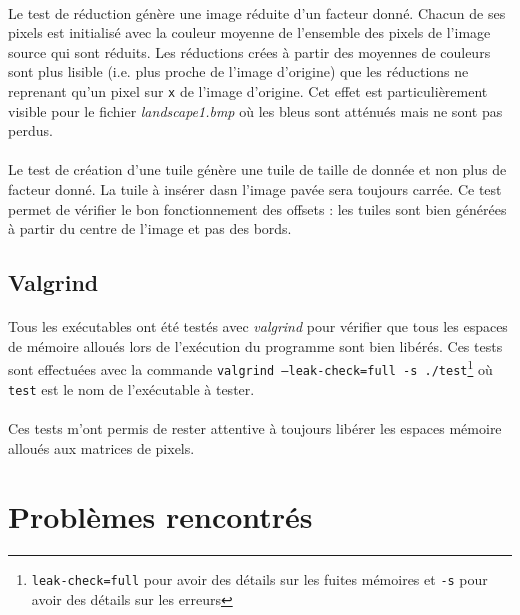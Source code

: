 \documentclass{article}
\begin{document}
    \paragraph{}
    Le test de réduction génère une image réduite d'un facteur donné. Chacun de ses pixels est initialisé avec la couleur moyenne de l'ensemble des pixels de l'image source qui sont réduits. Les réductions crées à partir des moyennes de couleurs sont plus lisible (i.e. plus proche de l'image d'origine) que les réductions ne reprenant qu'un pixel sur \texttt{x} de l'image d'origine. Cet effet est particulièrement visible pour le fichier \emph{landscape1.bmp} où les bleus sont atténués mais ne sont pas perdus.

    \paragraph{}
    Le test de création d'une tuile génère une tuile de taille de donnée et non plus de facteur donné. La tuile à insérer dasn l'image pavée sera toujours carrée. Ce test permet de vérifier le bon fonctionnement des offsets : les tuiles sont bien générées à partir du centre de l'image et pas des bords.



    \subsection{Valgrind}
    \paragraph{}
    Tous les exécutables ont été testés avec \emph{valgrind} pour vérifier que tous les espaces de mémoire alloués lors de l'exécution du programme sont bien libérés. Ces tests sont effectuées avec la commande \texttt{valgrind --leak-check=full -s ./test}\footnote{\texttt{leak-check=full} pour avoir des détails sur les fuites mémoires et \texttt{-s} pour avoir des détails sur les erreurs} où \texttt{test} est le nom de l'exécutable à tester.

    \paragraph{}
    Ces tests m'ont permis de rester attentive à toujours libérer les espaces mémoire alloués aux matrices de pixels.



    \newpage
    \section{Problèmes rencontrés}

    
\end{document}
